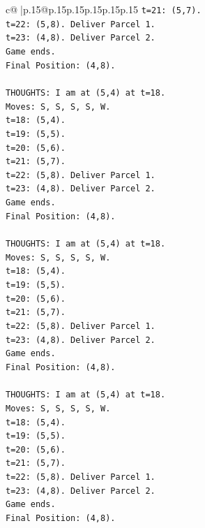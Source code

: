 \documentclass{article}
\begin{document}
{\begin{supertabular}{c@{$\;$}|p{.15\linewidth}@{}p{.15\linewidth}p{.15\linewidth}p{.15\linewidth}p{.15\linewidth}p{.15\linewidth}}
{{{\texttt{t=21: (5,7).} \\
\texttt{t=22: (5,8). Deliver Parcel 1.} \\
\texttt{t=23: (4,8). Deliver Parcel 2.} \\
\texttt{Game ends.} \\
\texttt{Final Position: (4,8).} \\
\\ 
\texttt{THOUGHTS: I am at (5,4) at t=18.} \\
\texttt{Moves: S, S, S, S, W.} \\
\texttt{t=18: (5,4).} \\
\texttt{t=19: (5,5).} \\
\texttt{t=20: (5,6).} \\
\texttt{t=21: (5,7).} \\
\texttt{t=22: (5,8). Deliver Parcel 1.} \\
\texttt{t=23: (4,8). Deliver Parcel 2.} \\
\texttt{Game ends.} \\
\texttt{Final Position: (4,8).} \\
\\ 
\texttt{THOUGHTS: I am at (5,4) at t=18.} \\
\texttt{Moves: S, S, S, S, W.} \\
\texttt{t=18: (5,4).} \\
\texttt{t=19: (5,5).} \\
\texttt{t=20: (5,6).} \\
\texttt{t=21: (5,7).} \\
\texttt{t=22: (5,8). Deliver Parcel 1.} \\
\texttt{t=23: (4,8). Deliver Parcel 2.} \\
\texttt{Game ends.} \\
\texttt{Final Position: (4,8).} \\
\\ 
\texttt{THOUGHTS: I am at (5,4) at t=18.} \\
\texttt{Moves: S, S, S, S, W.} \\
\texttt{t=18: (5,4).} \\
\texttt{t=19: (5,5).} \\
\texttt{t=20: (5,6).} \\
\texttt{t=21: (5,7).} \\
\texttt{t=22: (5,8). Deliver Parcel 1.} \\
\texttt{t=23: (4,8). Deliver Parcel 2.} \\
\texttt{Game ends.} \\
\texttt{Final Position: (4,8).} \\
}}}
\end{supertabular}}
\end{document}
